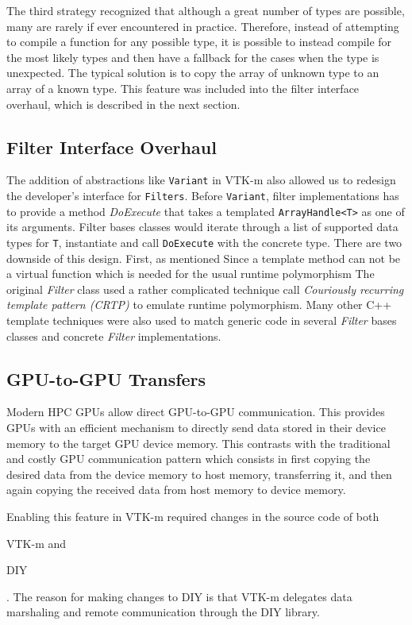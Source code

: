 The third strategy recognized that although a great number of types are possible, many are rarely if ever encountered in practice.
Therefore, instead of attempting to compile a function for any possible type, it is possible to instead compile for the most likely types and then have a fallback for the cases when the type is unexpected.
The typical solution is to copy the array of unknown type to an array of a known type.
This feature was included into the filter interface overhaul, which is described in the next section.

\subsection{Filter Interface Overhaul}


The addition of abstractions like \texttt{Variant} in VTK-m also allowed us to redesign the developer's interface for \texttt{Filters}. Before \texttt{Variant}, filter implementations has to provide a method \textit{DoExecute} that takes a templated \texttt{ArrayHandle<T>} as one of its arguments. Filter bases classes would iterate through a list of supported data types for \texttt{T}, instantiate and call \texttt{DoExecute} with the concrete type. There are two downside of this design. First, as mentioned Since a template method can not be a virtual function which is needed for the usual runtime polymorphism The original \textit{Filter} class used a rather complicated technique call \emph{Couriously recurring template pattern (CRTP)} to emulate runtime polymorphism. Many other C++ template techniques were also used to match generic code in several \textit{Filter} bases classes and concrete \textit{Filter} implementations.

\subsection{GPU-to-GPU Transfers}

Modern HPC GPUs allow direct GPU-to-GPU communication. This provides GPUs with an efficient mechanism to directly send data stored in their device memory to the target GPU device memory. This contrasts with the traditional and costly GPU communication pattern which consists in first copying the desired data from the device memory to host memory, transferring it, and then again copying the received data from host memory to device memory.

Enabling this feature in VTK-m required changes in the source code of both \begin{enumerate*} [label=\itshape(\alph*\upshape)]\item VTK-m and \item DIY\end{enumerate*}. The reason for making changes to DIY is that VTK-m delegates data marshaling and remote communication through the DIY library.

